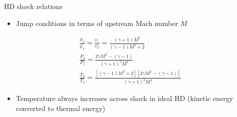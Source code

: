 \documentclass[10pt,aspectratio=169,usenames,dvipsnames]{beamer}
\begin{document}
\begin{frame}{HD shock relations}
\begin{itemize}
    \item Jump conditions in terms of upstream Mach number $M$
\end{itemize}
\begin{gather}
    \frac{\rho_2}{\rho_1} = \frac{v_1}{v_2} = \frac{\left( \gamma +1 \right) M^2}{\left( \gamma -1 \right) M^2 +2} \\
    \frac{P_2}{P_1} = \frac{2\gamma M^2 - \left( \gamma -1\right)}{\left(\gamma +1 \right)^2M^2} \\
    \frac{T_2}{T_1} = \frac{\left[ \left( \gamma -1 \right) M^2 +2 \right] \left[ 2\gamma M^2 - \left( \gamma -1 \right) \right]}{\left(\gamma +1 \right) ^2 M^2}
\end{gather}
\begin{itemize}
    \item Temperature always increases across shock in ideal HD (kinetic energy converted to thermal energy)
\end{itemize}
\end{frame}
\end{document}
